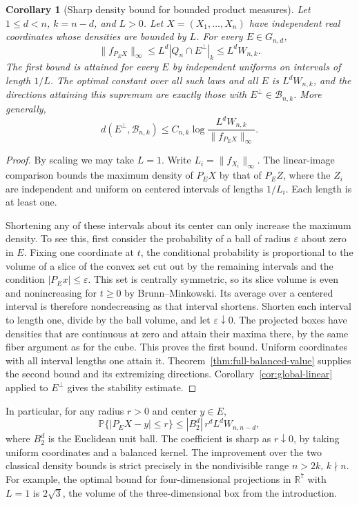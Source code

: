 \documentclass[11pt,a4paper]{article}
\newtheorem{corollary}[theorem]{Corollary}
\theoremstyle{remark}\newtheorem{remark}[theorem]{Remark}
\numberwithin{equation}{section}
\begin{document}
\begin{corollary}[Sharp density bound for bounded product measures]
\label{cor:product-marginals}
Let \(1\le d<n\), \(k=n-d\), and \(L>0\). Let
\(X=(X_1,\ldots,X_n)\) have independent real coordinates whose densities
are bounded by \(L\). For every \(E\in G_{n,d}\),
\[
 \|f_{P_EX}\|_\infty
 \le L^d|Q_n\cap E^\perp|_k
 \le L^d W_{n,k}.
\]
The first bound is attained for every \(E\) by independent uniforms on
intervals of length \(1/L\). The optimal constant over all such laws
and all \(E\) is \(L^dW_{n,k}\), and the directions attaining this
supremum are exactly those with \(E^\perp\in\mathcal B_{n,k}\).
More generally,
\[
 d(E^\perp,\mathcal B_{n,k})\le C_{n,k}
       \log\frac{L^dW_{n,k}}{\|f_{P_EX}\|_\infty}.
\]
\end{corollary}
\begin{proof}
By scaling we may take \(L=1\). Write \(L_i=\|f_{X_i}\|_\infty\).
The linear-image comparison bounds the maximum density of \(P_EX\) by
that of \(P_EZ\), where the \(Z_i\) are independent and uniform on
centered intervals of lengths \(1/L_i\). Each length is at least one.

Shortening any of these intervals about its center can only increase
the maximum density. To see this, first consider the probability of a
ball of radius \(\varepsilon\) about zero in \(E\). Fixing one
coordinate at \(t\), the conditional probability is proportional to
the volume of a slice of the convex set cut out by the remaining
intervals and the condition \(|P_E x|\le\varepsilon\). This set is
centrally symmetric, so its slice volume is even and nonincreasing
for \(t\ge0\) by Brunn--Minkowski. Its average over a centered
interval is therefore nondecreasing as that interval shortens. Shorten each
interval to length one, divide by the ball volume, and let
\(\varepsilon\downarrow0\). The projected boxes have densities that
are continuous at zero and attain their maxima there, by the same
fiber argument as for the cube. This proves the first bound.
Uniform coordinates with all interval lengths one attain it.
Theorem~\ref{thm:full-balanced-value} supplies the second bound and
its extremizing directions. Corollary~\ref{cor:global-linear} applied
to \(E^\perp\) gives the stability estimate.
\end{proof}

In particular, for any radius \(r>0\) and center \(y\in E\),
\[
 \mathbb P\{|P_EX-y|\le r\}
 \le |B_2^d|\, r^d L^d W_{n,n-d},
\]
where \(B_2^d\) is the Euclidean unit ball. The coefficient is sharp
as \(r\downarrow0\), by taking uniform coordinates and a balanced
kernel. The improvement over the two classical density bounds is
strict precisely in the nondivisible range \(n>2k\), \(k\nmid n\).
For example, the optimal bound for four-dimensional projections in
\(\mathbb R^7\) with \(L=1\) is \(2\sqrt3\), the volume of the
three-dimensional box from the introduction.
\end{document}
